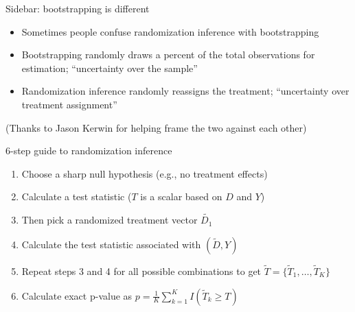 \documentclass{beamer}
\begin{document}
\begin{frame}{Sidebar: bootstrapping is different}

\begin{itemize}
\item Sometimes people confuse randomization inference with bootstrapping
\item Bootstrapping randomly draws a percent of the total observations for estimation; ``uncertainty over the sample''
\item Randomization inference randomly reassigns the treatment;  ``uncertainty over treatment assignment''
\end{itemize}(Thanks to Jason Kerwin for helping frame the two against each other)

\end{frame}


\begin{frame}{6-step guide to randomization inference}

\begin{enumerate}
\item Choose a sharp null hypothesis (e.g., no treatment effects)
\item Calculate a test statistic ($T$ is a scalar based on $D$ and $Y$)
\item Then pick a randomized treatment vector $\tilde{D_1}$
\item Calculate the test statistic associated with $(\tilde{D},Y)$
\item Repeat steps 3 and 4 for all possible combinations to get $\tilde{T} = \{\tilde{T}_1, \dots , \tilde{T}_K \}$
\item Calculate exact p-value as $p=\frac{1}{K} \sum_{k=1}^K I(\tilde{T}_k \geq T)$
\end{enumerate}
\end{frame}
\end{document}
